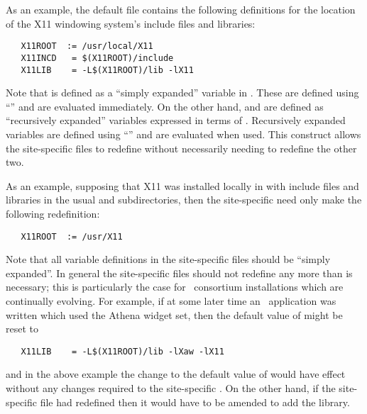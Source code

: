 As an example, the default  file contains the following
definitions for the location of the \textsc{X11} windowing system's include
files and libraries:

\begin{verbatim}
   X11ROOT  := /usr/local/X11
   X11INCD   = $(X11ROOT)/include
   X11LIB    = -L$(X11ROOT)/lib -lX11
\end{verbatim}

\noindent
Note that  is defined as a ``simply expanded'' variable in \gnu
{}.  These are defined using ``\code{:=}'' and are evaluated
immediately.  On the other hand,  and  are defined
as ``recursively expanded'' variables expressed in terms of .
Recursively expanded variables are defined using ``\code{=}'' and are
evaluated when used.  This construct allows the site-specific 
files to redefine  without necessarily needing to redefine the
other two.

As an example, supposing that \textsc{X11} was installed locally in
 with include files and libraries in the usual 
and  subdirectories, then the site-specific  need
only make the following redefinition:

\begin{verbatim}
   X11ROOT  := /usr/X11
\end{verbatim}

\noindent
Note that all variable definitions in the site-specific  files
should be ``simply expanded''.  In general the site-specific files should not
redefine any more than is necessary; this is particularly the case for
\aipspp\ consortium installations which are continually evolving.  For
example, if at some later time an \aipspp\ application was written which
used the Athena widget set, then the default value of  might be
reset to

\begin{verbatim}
   X11LIB    = -L$(X11ROOT)/lib -lXaw -lX11
\end{verbatim}

\noindent
and in the above example the change to the default value of 
would have effect without any changes required to the site-specific
.  On the other hand, if the site-specific  file
had redefined  then it would have to be amended to add the
 library.

